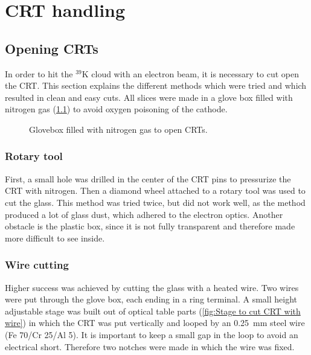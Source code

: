 
\chapter{CRT handling}
\label{chap:CRT handling}

\section{Opening CRTs}
\label{sec:Opening CRTs}

In order to hit the $^{39}\mathrm{K}$ cloud with an electron beam, it is necessary to cut open the CRT. This section explains the different methods which were tried and which resulted in clean and easy cuts. All slices were made in a glove box filled with nitrogen gas (\cref{fig:glovebox}) to avoid oxygen poisoning of the cathode.

\begin{figure}[h]
	
	\caption{Glovebox filled with nitrogen gas to open CRTs.}
	\label{fig:glovebox}
\end{figure}


\subsection{Rotary tool}
\label{subsec:Rotary tool}


First, a small hole was drilled in the center of the CRT pins to pressurize the CRT with nitrogen. Then a diamond wheel attached to a rotary tool was used to cut the glass. This method was tried twice, but did not work well, as the method produced a lot of glass dust, which adhered to the electron optics. Another obstacle is the plastic box, since it is not fully transparent and therefore made more difficult to see inside. 


\subsection{Wire cutting}
\label{subsec:Wire cutting}

Higher success was achieved by cutting the glass with a heated wire. Two wires were put through the glove box, each ending in a ring terminal. A small height adjustable stage was built out of optical table parts (\cref{fig:Stage to cut CRT with wire}) in which the CRT was put vertically and looped by an \SI{0.25}{\milli\meter} steel wire (Fe 70/Cr 25/Al 5). It is important to keep a small gap in the loop to avoid an electrical short. Therefore two notches were made in which the wire was fixed.

